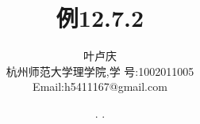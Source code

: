 \documentclass[a4paper, 12pt]{article} %
\makeatletter
\renewcommand{\maketitle}{ %
  \renewcommand\refname{参考文献}
  \newcommand{\D}{\displaystyle}\newcommand{\ri}{\Rightarrow}
  \newcommand{\ds}{\displaystyle} \renewcommand{\ni}{\noindent}
  \newcommand{\pa}{\partial} \newcommand{\Om}{\Omega}
  \newcommand{\om}{\omega} \newcommand{\sik}{\sum_{i=1}^k}
  \newcommand{\vov}{\Vert\omega\Vert} \newcommand{\Umy}{U_{\mu_i,y^i}}
  \newcommand{\lamns}{\lambda_n^{^{\scriptstyle\sigma}}}
  \newcommand{\chiomn}{\chi_{_{\Omega_n}}}
  \newcommand{\ullim}{\underline{\lim}} \newcommand{\bsy}{\boldsymbol}
  \newcommand{\mvb}{\mathversion{bold}} \newcommand{\la}{\lambda}
  \newcommand{\La}{\Lambda} \newcommand{\va}{\varepsilon}
  \newcommand{\be}{\beta} \newcommand{\al}{\alpha}
  \newcommand{\dis}{\displaystyle} \newcommand{\R}{{\mathbb R}}
  \newcommand{\N}{{\mathbb N}} \newcommand{\cF}{{\mathcal F}}
  \newcommand{\gB}{{\mathfrak B}} \newcommand{\eps}{\epsilon}
  \begin{flushright} %
    {\LARGE\@title} %
    
    \vspace{50pt} %
    
    {\large\@author} %
    \\\@date %
    
    \vspace{40pt} %
  \end{flushright}
}
\makeatother
\begin{document}
\begin{CJK}{UTF8}{gkai}
  \title{\textbf{例12.7.2}}
  \author{\small{叶卢庆}\\{\small{杭州师范大学理学院,学
        号:1002011005}}\\{\small{Email:h5411167@gmail.com}}} %
  \renewcommand{\today}{\number\year. \number\month. \number\day}
  \date{\today} %
  
  
  
  \maketitle %
  
  
  
  
  
  
  

\end{CJK}
\end{document}
